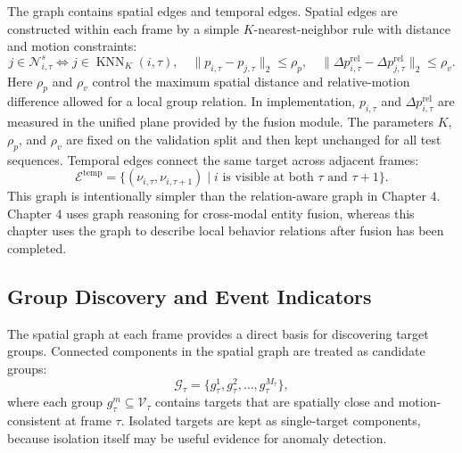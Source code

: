 The graph contains spatial edges and temporal edges. Spatial edges are constructed within each frame by a simple \(K\)-nearest-neighbor rule with distance and motion constraints:
\begin{equation}
  j\in\mathcal{N}_{i,\tau}^{s}
  \Longleftrightarrow
  j\in\operatorname{KNN}_{K}(i,\tau),\quad
  \|p_{i,\tau}-p_{j,\tau}\|_2\leq\rho_p,\quad
  \|\Delta p^{\mathrm{rel}}_{i,\tau}-\Delta p^{\mathrm{rel}}_{j,\tau}\|_2\leq\rho_v.
\end{equation}
Here \(\rho_p\) and \(\rho_v\) control the maximum spatial distance and relative-motion difference allowed for a local group relation. In implementation, \(p_{i,\tau}\) and \(\Delta p^{\mathrm{rel}}_{i,\tau}\) are measured in the unified plane provided by the fusion module. The parameters \(K\), \(\rho_p\), and \(\rho_v\) are fixed on the validation split and then kept unchanged for all test sequences. Temporal edges connect the same target across adjacent frames:
\begin{equation}
  \mathcal{E}^{\mathrm{temp}}=\{(\nu_{i,\tau},\nu_{i,\tau+1})\mid i \text{ is visible at both } \tau \text{ and } \tau+1\}.
\end{equation}
This graph is intentionally simpler than the relation-aware graph in Chapter 4. Chapter 4 uses graph reasoning for cross-modal entity fusion, whereas this chapter uses the graph to describe local behavior relations after fusion has been completed.

\subsection{Group Discovery and Event Indicators}
The spatial graph at each frame provides a direct basis for discovering target groups. Connected components in the spatial graph are treated as candidate groups:
\begin{equation}
  \mathcal{G}_{\tau}=\{g_{\tau}^{1},g_{\tau}^{2},\ldots,g_{\tau}^{M_{\tau}}\},
\end{equation}
where each group \(g_{\tau}^{m}\subseteq\mathcal{V}_{\tau}\) contains targets that are spatially close and motion-consistent at frame \(\tau\). Isolated targets are kept as single-target components, because isolation itself may be useful evidence for anomaly detection.

